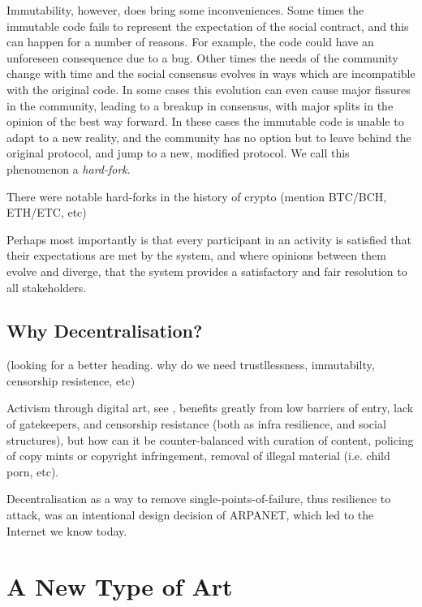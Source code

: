 Immutability, however, does bring some inconveniences. Some times the immutable code fails to represent the expectation of the social contract, and this can happen for a number of reasons. For example, the code could have an unforeseen consequence due to a bug. Other times the needs of the community change with time and the social consensus evolves in ways which are incompatible with the original code. In some cases this evolution can even cause major fissures in the community, leading to a breakup in consensus, with major splits in the opinion of the best way forward. In these cases the immutable code is unable to adapt to a new reality, and the community has no option but to leave behind the original protocol, and jump to a new, modified protocol. We call this phenomenon a \emph{hard-fork}.

There were notable hard-forks in the history of crypto (mention BTC/BCH, ETH/ETC, etc)

Perhaps most importantly is that every participant in an activity is satisfied that their expectations are met by the system, and where opinions between them evolve and diverge, that the system provides a satisfactory and fair resolution to all stakeholders. 

\subsection{Why Decentralisation?}
(looking for a better heading. why do we need trustllessness, immutabilty, censorship resistence, etc)

Activism through digital art, see \cite[p.~212]{hopeDigitalArtsIntroduction2014} , benefits greatly from low barriers of entry, lack of gatekeepers, and censorship resistance (both as infra resilience, and social structures), but how can it be counter-balanced with curation of content, policing of copy mints or copyright infringement, removal of illegal material (i.e. child porn, etc).

Decentralisation as a way to remove single-points-of-failure, thus resilience to attack, was an intentional design decision of ARPANET, which led to the Internet we know today. \cite[p.10]{paulDigitalArt2015}



\section{A New Type of Art}

